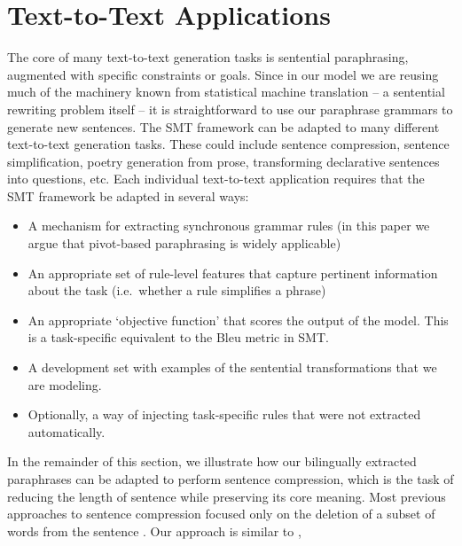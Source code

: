 \documentclass[11pt]{article}
\begin{document}


\section{Text-to-Text Applications} \label{adaptation}

The core of many text-to-text generation tasks is sentential
paraphrasing, augmented with specific constraints or
goals. Since in our model we are reusing much of the machinery known
from statistical machine translation -- a sentential rewriting problem
itself -- it is straightforward to use our paraphrase grammars to generate new sentences. The SMT framework  can be adapted to 
many different text-to-text generation tasks. 
These could include sentence compression, sentence simplification, poetry generation from prose, transforming declarative sentences into questions, etc. 
Each individual text-to-text application requires that the SMT framework be adapted in several ways:
\begin{itemize}
\item A mechanism for extracting synchronous grammar rules (in this paper we argue that pivot-based paraphrasing is widely applicable)
\item An appropriate set of rule-level features that capture pertinent information about the task
 (i.e.\ whether a rule simplifies a phrase)
\item An appropriate `objective function' that scores the output of the model.  This is a task-specific equivalent to the Bleu metric in SMT.
\item A development set with examples of the sentential transformations that we are modeling.  
\item Optionally, a way of injecting task-specific rules that were not extracted automatically.
\end{itemize} 
In the remainder of this section, we illustrate how our bilingually extracted paraphrases can be adapted to perform sentence compression,
which is the task of reducing the length of sentence while preserving its core
meaning.  Most previous approaches to sentence compression focused only on the deletion of a subset of words from the sentence \cite{KnightMarcuAI02}.  Our approach is similar to 
, 
\end{document}
